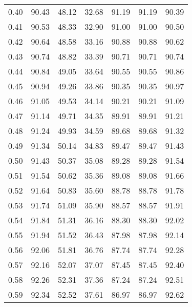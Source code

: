 \begin{tabular}{|c|c|c|c|c|c|c|}
      0.40 &     90.43 &     48.12 &      32.68 &   91.19 &      91.19 &         90.39 \\
      0.41 &     90.53 &     48.33 &      32.90 &   91.00 &      91.00 &         90.50 \\
      0.42 &     90.64 &     48.58 &      33.16 &   90.88 &      90.88 &         90.62 \\
      0.43 &     90.74 &     48.82 &      33.39 &   90.71 &      90.71 &         90.74 \\
      0.44 &     90.84 &     49.05 &      33.64 &   90.55 &      90.55 &         90.86 \\
      0.45 &     90.94 &     49.26 &      33.86 &   90.35 &      90.35 &         90.97 \\
      0.46 &     91.05 &     49.53 &      34.14 &   90.21 &      90.21 &         91.09 \\
      0.47 &     91.14 &     49.71 &      34.35 &   89.91 &      89.91 &         91.21 \\
      0.48 &     91.24 &     49.93 &      34.59 &   89.68 &      89.68 &         91.32 \\
      0.49 &     91.34 &     50.14 &      34.83 &   89.47 &      89.47 &         91.43 \\
      0.50 &     91.43 &     50.37 &      35.08 &   89.28 &      89.28 &         91.54 \\
      0.51 &     91.54 &     50.62 &      35.36 &   89.08 &      89.08 &         91.66 \\
      0.52 &     91.64 &     50.83 &      35.60 &   88.78 &      88.78 &         91.78 \\
      0.53 &     91.74 &     51.09 &      35.90 &   88.57 &      88.57 &         91.91 \\
      0.54 &     91.84 &     51.31 &      36.16 &   88.30 &      88.30 &         92.02 \\
      0.55 &     91.94 &     51.52 &      36.43 &   87.98 &      87.98 &         92.14 \\
      0.56 &     92.06 &     51.81 &      36.76 &   87.74 &      87.74 &         92.28 \\
      0.57 &     92.16 &     52.07 &      37.07 &   87.45 &      87.45 &         92.40 \\
      0.58 &     92.26 &     52.31 &      37.36 &   87.24 &      87.24 &         92.51 \\
      0.59 &     92.34 &     52.52 &      37.61 &   86.97 &      86.97 &         92.62 \\

\end{tabular}

